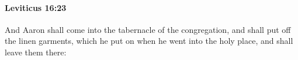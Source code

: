 
		\paragraph{Leviticus 16:23} %
			\label{LEVITICUS-16-23}

			And Aaron shall come into the tabernacle of the congregation, and shall put off the linen garments, which he put on when he went into the holy place, and shall leave them there:


